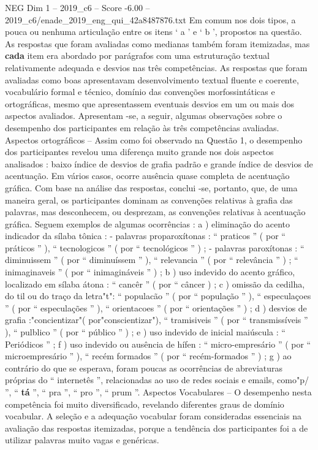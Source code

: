 \begin{textsample}{NEG Dim 1 – 2019\_c6 – Score -6.00 – 2019\_c6/enade\_2019\_eng\_qui\_42a8487876.txt}
Em comum nos dois tipos, a pouca ou nenhuma articulação entre os itens ‘ a ’ e ‘ b ’, propostos na questão.
As respostas que foram avaliadas como medianas também foram itemizadas, mas \textbf{cada} item era abordado por parágrafos com uma estruturação textual relativamente adequada e desvios nas três competências.
As respostas que foram avaliadas como boas apresentavam desenvolvimento textual fluente e coerente, vocabulário formal e técnico, domínio das convenções morfossintáticas e ortográficas, mesmo que apresentassem eventuais desvios em um ou mais dos aspectos avaliados.
Apresentam -se, a seguir, algumas observações sobre o desempenho dos participantes em relação às três competências avaliadas.
Aspectos ortográficos – Assim como foi observado na Questão 1, o desempenho dos participantes revelou uma diferença muito grande nos dois aspectos analisados : baixo índice de desvios de grafia padrão e grande índice de desvios de acentuação.
Em vários casos, ocorre ausência quase completa de acentuação gráfica.
Com base na análise das respostas, conclui -se, portanto, que, de uma maneira geral, os participantes dominam as convenções relativas à grafia das palavras, mas desconhecem, ou desprezam, as convenções relativas à acentuação gráfica.
Seguem exemplos de algumas ocorrências : a ) eliminação do acento indicador da sílaba tônica : - palavras proparoxítonas : “ praticos ” ( por “ práticos ” ), “ tecnologicos ” ( por “ tecnológicos ” ) ; - palavras paroxítonas : “ diminuissem ” ( por “ diminuíssem ” ), “ relevancia ” ( por “ relevância ” ) ; “ inimaginaveis ” ( por “ inimagináveis ” ) ; b ) uso indevido do acento gráfico, localizado em sílaba átona : “ cancêr ” ( por “ câncer ) ; c ) omissão da cedilha, do til ou do traço da letra"t": “ populacão ” ( por “ população ” ), “ especulaçoes ” ( por “ especulações ” ), “ orientacoes ” ( por “ orientações ” ) ; d ) desvios de grafia :"concientizar"( por"conscientizar"), “ tramisiveis ” ( por “ transmissíveis ” ), “ pulblico ” ( por “ público ” ) ; e ) uso indevido de inicial maiúscula : “ Periódicos ” ; f ) uso indevido ou ausência de hífen : “ micro-empresário ” ( por “ microempresário ” ), “ recém formados ” ( por “ recém-formados ” ) ; g ) ao contrário do que se esperava, foram poucas as ocorrências de abreviaturas próprias do “ internetês ”, relacionadas ao uso de redes sociais e emails, como"p/ ”, “ \textbf{tá} ”, “ pra ”, “ pro ”, “ prum ”.
Aspectos Vocabulares – O desempenho nesta competência foi muito diversificado, revelando diferentes graus de domínio vocabular.
A seleção e a adequação vocabular foram consideradas essenciais na avaliação das respostas itemizadas, porque a tendência dos participantes foi a de utilizar palavras muito vagas e genéricas.

\end{textsample}
